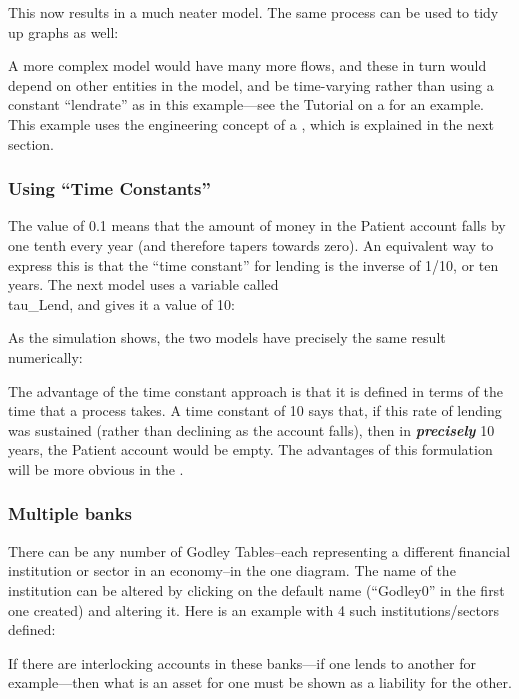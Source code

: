 

This now results in a much neater model. The same process can be used
to tidy up graphs as well:



A more complex model would have many more flows, and these in turn
would depend on other entities in the model, and be time-varying
rather than using a constant ``lendrate'' as in this example---see the
Tutorial on a  for an
example. This example uses the engineering concept of a
, which is explained in the
next section. 

\subsubsection{Using ``Time Constants''}
\label{time-constants}

The value of 0.1 means that the amount of money in the Patient account
falls by one tenth every year (and therefore tapers towards zero). An
equivalent way to express this is that the ``time constant'' for
lending is the inverse of 1/10, or ten years. The next model uses a
variable called \\tau\_Lend, and gives it a value of 10: 


As the simulation shows, the two models have precisely the same result
numerically:



The advantage of the time constant approach is that it is defined in
terms of the time that a process takes. A time constant of 10 says
that, if this rate of lending was sustained (rather than declining as
the account falls), then in {\bf\em precisely} 10 years, the Patient account
would be empty. The advantages of this formulation will be more
obvious in the .


\subsubsection{Multiple banks}

There can be any number of Godley Tables--each representing a
different financial institution or sector in an economy--in the one
diagram. The name of the institution can be altered by clicking on the
default name (``Godley0'' in the first one created) and altering
it. Here is an example with 4 such institutions/sectors defined:



If there are interlocking accounts in these banks---if one lends to
another for example---then what is an asset for one must be shown as a
liability for the other. 
